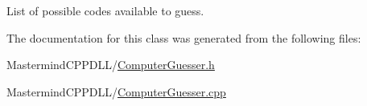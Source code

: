 List of possible codes available to guess. 



The documentation for this class was generated from the following files\+:\begin{DoxyCompactItemize}
\item 
Mastermind\+C\+P\+P\+D\+L\+L/\hyperlink{_computer_guesser_8h}{Computer\+Guesser.\+h}\item 
Mastermind\+C\+P\+P\+D\+L\+L/\hyperlink{_computer_guesser_8cpp}{Computer\+Guesser.\+cpp}\end{DoxyCompactItemize}
